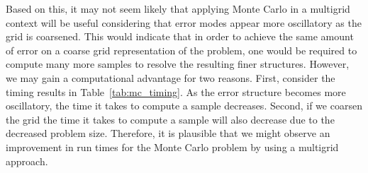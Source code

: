 \documentclass[note]{TechNote}
\begin{document}
Based on this, it may not seem likely that applying Monte Carlo in a
multigrid context will be useful considering that error modes appear
more oscillatory as the grid is coarsened. This would indicate that in
order to achieve the same amount of error on a coarse grid
representation of the problem, one would be required to compute many
more samples to resolve the resulting finer structures. However, we
may gain a computational advantage for two reasons. First, consider
the timing results in Table~\ref{tab:mc_timing}. As the error
structure becomes more oscillatory, the time it takes to compute a
sample decreases. Second, if we coarsen the grid the time it takes to
compute a sample will also decrease due to the decreased problem
size. Therefore, it is plausible that we might observe an improvement
in run times for the Monte Carlo problem by using a multigrid
approach.

\clearpage

\end{document}
